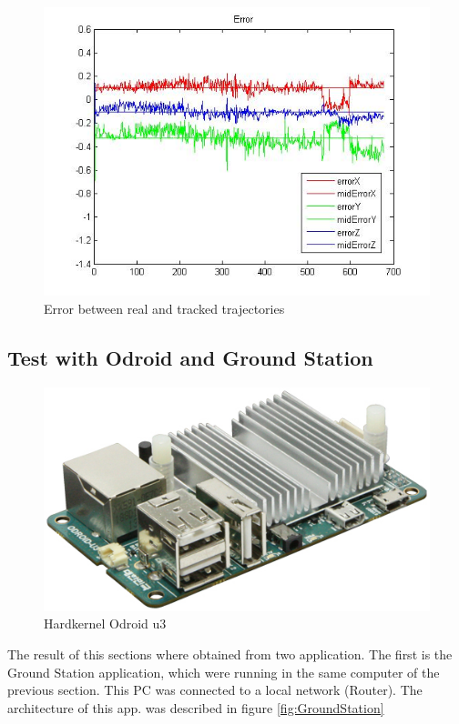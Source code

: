 	\begin{figure}[htp]
		\centering
		\includegraphics[width=0.7\linewidth]{../Images/c4/errors_stereo}
		\caption{Error between real and tracked trajectories}
		\label{fig:errors_stereo_PC}
	\end{figure}	
	
	\newpage
	
\subsection{Test with Odroid and Ground Station}
	\label{test_with_odroid_and_GT}
	
	\begin{figure}
		\includegraphics[width=\linewidth]{../Images/c4/odroidu3}
		\caption{Hardkernel Odroid u3}
		\label{fig:odroidu3}
	\end{figure}
		
	The result of this sections where obtained from two application. The first is the Ground Station application, which were running in the same computer of the previous section. This PC was connected to a local network (Router). The architecture of this app.  was described in figure \ref{fig:GroundStation}
	
